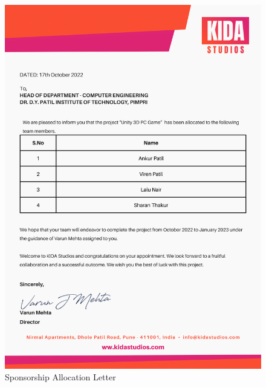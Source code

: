 \documentclass[12pt]{report}
\begin{document}
\begin{figure}[h]
\centering
\includegraphics[scale=0.6]{Allocation.png}
\caption{Sponsorship Allocation Letter}
\label{Sponsorship Letter}
\end{figure}
\thispagestyle{empty}
\clearpage
\end{document}
